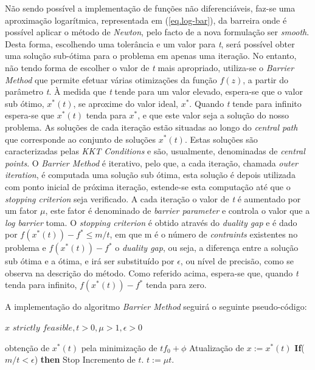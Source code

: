 \documentclass[a4paper]{IEEEtran}
\begin{document}
Não sendo possível a implementação de funções não diferenciáveis, faz-se uma aproximação logarítmica, representada em (\ref{eq.log-bar}), da barreira onde é possível aplicar o método de \textit{Newton}, pelo facto de a nova formulação ser \textit{smooth}. Desta forma, escolhendo uma tolerância e um valor para \textit{t}, será possível obter uma solução sub-ótima para o problema em apenas uma iteração. No entanto, não tendo forma de escolher o valor de \textit{t} mais apropriado, utiliza-se o \textit{Barrier Method} que permite efetuar várias otimizações da função $f(z)$, a partir do parâmetro \textit{t}.
À medida que \textit{t} tende para um valor elevado, espera-se que o valor sub ótimo, $x^\ast(t)$, se aproxime do valor ideal, $x^\ast$. Quando \textit{t} tende para infinito espera-se que $x^\ast(t)$ tenda para $x^\ast$, e que este valor seja a solução do nosso problema. As soluções de cada iteração estão situadas ao longo do \textit{central path} que corresponde ao conjunto de soluções $x^\ast(t)$. Estas soluções são caracterizadas pelas \textit{KKT Conditions} e são, usualmente, denominadas de \textit{central points}. O \textit{Barrier Method} é iterativo, pelo que, a cada iteração, chamada \textit{outer iteration}, é computada uma solução sub ótima, esta solução é depois utilizada com ponto inicial de próxima iteração, estende-se esta computação até que o \textit{stopping criterion} seja verificado. A cada iteração o valor de \textit{t} é aumentado por um fator $\mu$, este fator é denominado de \textit{barrier parameter} e controla o valor que a \textit{log barrier} toma. O \textit{stopping criterion} é obtido através do \textit{duality gap} e é dado por $f(x^\ast(t))-f^\ast \leq m/t$, em que m é o número de \textit{contraints} existentes no problema e $f(x^\ast(t))-f^\ast$ o \textit{duality gap}, ou seja, a diferença entre a solução sub ótima e a ótima, e irá ser substituído por $\epsilon$, ou nível de precisão, como se observa na descrição do método. Como referido acima, espera-se que, quando \textit{t} tenda para infinito, $f(x^\ast(t))-f^\ast$ tenda para zero.

A implementação do algoritmo \textit{Barrier Method}\cite{BARRIER} seguirá o seguinte pseudo-código:

\begin{algorithmic}[1]
\renewcommand{\algorithmicrequire}{\textbf{Input:}}
\REQUIRE $x \textit{ strictly feasible}, t > 0, \mu > 1, \epsilon > 0$

\STATE obtenção de $x^* (t)$ pela minimização de $t f_0 + \phi$
\STATE Atualização de $x:=x^* (t)$
\STATE \textbf{If}($m/t < \epsilon$) \textbf{then} Stop
\STATE Incremento de $t$. $t:=\mu t$.
\end{algorithmic}
\end{document}
